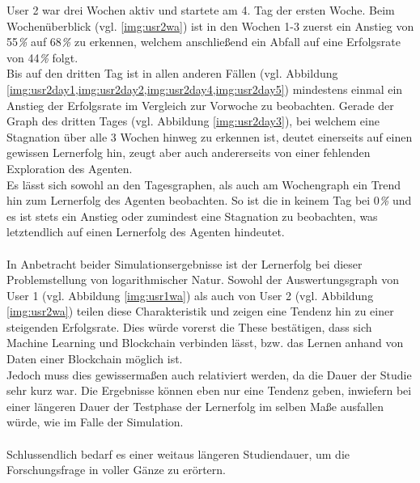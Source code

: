 User 2 war drei Wochen aktiv und startete am 4. Tag der ersten Woche.
Beim Wochenüberblick (vgl. \ref{img:usr2wa}) ist in den Wochen 1-3 zuerst ein Anstieg von 55\textit{\%} auf 68\textit{\%} zu erkennen, welchem anschließend ein Abfall auf eine Erfolgsrate von 44\textit{\%} folgt. \\
Bis auf den dritten Tag ist in allen anderen Fällen (vgl. Abbildung \cref{img:usr2day1,img:usr2day2,img:usr2day4,img:usr2day5})  mindestens einmal ein Anstieg der Erfolgsrate im Vergleich zur Vorwoche zu beobachten. Gerade der Graph des dritten Tages (vgl. Abbildung \ref{img:usr2day3}), bei welchem eine Stagnation über alle 3 Wochen hinweg zu erkennen ist, deutet einerseits auf einen gewissen Lernerfolg hin, zeugt aber auch andererseits von einer fehlenden Exploration des Agenten. \\
Es lässt sich sowohl an den Tagesgraphen, als auch am Wochengraph ein Trend hin zum Lernerfolg des Agenten beobachten. So ist die  in keinem Tag bei 0\textit{\%} und es ist stets ein Anstieg oder zumindest eine Stagnation zu beobachten, was letztendlich auf einen Lernerfolg des Agenten hindeutet.
\\\\
In Anbetracht beider Simulationsergebnisse ist der Lernerfolg bei dieser Problemstellung von logarithmischer Natur. Sowohl der Auswertungsgraph von User 1 (vgl. Abbildung \ref{img:usr1wa}) als auch von User 2 (vgl. Abbildung \ref{img:usr2wa}) teilen diese Charakteristik und zeigen eine Tendenz hin zu einer steigenden Erfolgsrate. Dies würde vorerst die These bestätigen, dass sich Machine Learning und Blockchain verbinden lässt, bzw. das Lernen anhand von Daten einer Blockchain möglich ist. \\
Jedoch muss dies gewissermaßen auch relativiert werden, da die Dauer der Studie sehr kurz war. Die Ergebnisse können eben nur eine Tendenz geben, inwiefern bei einer längeren Dauer der Testphase der Lernerfolg im selben Maße ausfallen würde, wie im Falle der Simulation. \\\\
Schlussendlich bedarf es einer weitaus längeren Studiendauer, um die Forschungsfrage in voller Gänze zu erörtern. 

